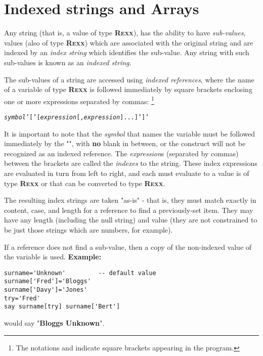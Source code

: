 \chapter{Indexed strings and Arrays}\label{refinstr}
 
Any \nr{} string (that is, a value of type \textbf{R\textsc{exx}}), has the
ability to have \emph{sub-values}, values (also of type \textbf{R\textsc{exx}})
which are associated with the original string and are indexed by an
\emph{index string} which identifies the sub-value.
Any string with such sub-values is known as an \emph{indexed string}.
 
The sub-values of a \nr{} string are accessed using \emph{indexed
references}, where the name of a variable of type \textbf{R\textsc{exx}} is
followed immediately by square brackets enclosing one or more
expressions separated by commas:
\footnote{
The notations \keyword{'['} and \keyword{']'}
indicate square brackets appearing in the \nr{} program.
}
\begin{shaded}
\begin{alltt}
\emph{symbol}'['[\emph{expression}[, \emph{expression}]...]']'
\end{alltt}
\end{shaded}
It is important to note that the \emph{symbol} that names the
variable must be followed immediately by the "\keyword{[}",
with \textbf{no} blank in between, or the construct will not be
recognized as an indexed reference.
 The \emph{expression}s (separated by commas) between the
brackets are called the \emph{indexes} to the string.
These index expressions are evaluated in turn from left to right, and
each must evaluate to a value is of type \textbf{R\textsc{exx}} or that can be
converted to type \textbf{R\textsc{exx}}.
 
The resulting index strings are taken "as-is" - that is, they
must match exactly in content, case, and length for a reference to find
a previously-set item.
They may have any length (including the null string) and value (they are
not constrained to be just those strings which are numbers, for
example).
 
If a reference does not find a sub-value, then a copy of the non-indexed
value of the variable is used.
 \textbf{Example:}
\begin{lstlisting}
surname='Unknown'         -- default value
surname['Fred']='Bloggs'
surname['Davy']='Jones'
try='Fred'
say surname[try] surname['Bert']
\end{lstlisting}
would say "\textbf{Bloggs Unknown}".
 

